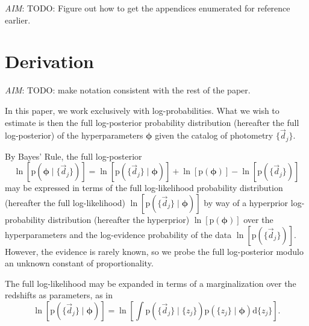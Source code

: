 \documentclass[iop]{emulateapj}
\newcommand{\todo}[3]{{\color{#2}\emph{#1}: #3}}
\newcommand{\aim}[1]{\todo{AIM}{red}{#1}}
\newcommand{\data}{\ensuremath{\vec{d}}}%
\newcommand{\pr}[1]{\ensuremath{\mathrm{p}(#1)}}%
\newcommand{\gvn}{\mid}%
\newcommand{\integral}[2]{\ensuremath{\int #1 \mathrm{d} #2}}
\newcommand{\bvec}[1]{\ensuremath{\boldsymbol{#1}}}%
\newcommand{\ndphi}{\bvec{\phi}}
\begin{document}
\appendix

\aim{TODO: Figure out how to get the appendices enumerated for reference earlier.}

\section{Derivation}
\label{app:math}

\aim{TODO: make notation consistent with the rest of the paper.}


In this paper, we work exclusively with log-probabilities.  
What we wish to estimate is then the full log-posterior probability distribution (hereafter the full log-posterior) of the hyperparameters $\ndphi$ given the catalog of photometry $\{\data_{j}\}$.

By Bayes' Rule, the full log-posterior
\begin{equation}
\label{eqn:basicbayes}
\ln[\pr{\ndphi \gvn \{\data_{j}\}}] = \ln[\pr{\{\data_{j}\} \gvn \ndphi}] + \ln[\pr{\ndphi}] - \ln[\pr{\{\data_{j}\}}]
\end{equation}
may be expressed in terms of the full log-likelihood probability distribution (hereafter the full log-likelihood) $\ln[\pr{\{\data_{j}\} \gvn \ndphi}]$ by way of a hyperprior log-probability distribution (hereafter the hyperprior) $\ln[\pr{\ndphi}]$ over the hyperparameters and the log-evidence probability of the data $\ln[\pr{\{\data_{j}\}}]$.
However, the evidence is rarely known, so we probe the full log-posterior modulo an unknown constant of proportionality.

The full log-likelihood may be expanded in terms of a marginalization over the redshifts as parameters, as in 
\begin{equation}
\label{eqn:marginalize}
\ln[\pr{\{\data_{j}\} \gvn \ndphi}] = \ln\left[\integral{\pr{\{\data_{j}\} \gvn \{z_{j}\}} \pr{\{z_{j}\} \gvn \ndphi}}{\{z_{j}\}}\right].
\end{equation}
\end{document}
